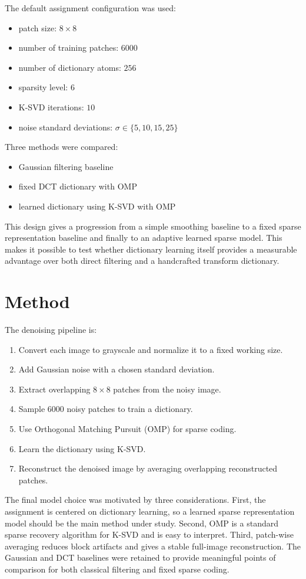 \documentclass[11pt]{article}
\begin{document}
The default assignment configuration was used:
\begin{itemize}
\item patch size: $8 \times 8$
\item number of training patches: $6000$
\item number of dictionary atoms: $256$
\item sparsity level: $6$
\item K-SVD iterations: $10$
\item noise standard deviations: $\sigma \in \{5, 10, 15, 25\}$
\end{itemize}

Three methods were compared:
\begin{itemize}
\item Gaussian filtering baseline
\item fixed DCT dictionary with OMP
\item learned dictionary using K-SVD with OMP
\end{itemize}

This design gives a progression from a simple smoothing baseline to a fixed sparse representation baseline and finally to an adaptive learned sparse model. This makes it possible to test whether dictionary learning itself provides a measurable advantage over both direct filtering and a handcrafted transform dictionary.

\section{Method}
The denoising pipeline is:
\begin{enumerate}
\item Convert each image to grayscale and normalize it to a fixed working size.
\item Add Gaussian noise with a chosen standard deviation.
\item Extract overlapping $8 \times 8$ patches from the noisy image.
\item Sample $6000$ noisy patches to train a dictionary.
\item Use Orthogonal Matching Pursuit (OMP) for sparse coding.
\item Learn the dictionary using K-SVD.
\item Reconstruct the denoised image by averaging overlapping reconstructed patches.
\end{enumerate}

The final model choice was motivated by three considerations. First, the assignment is centered on dictionary learning, so a learned sparse representation model should be the main method under study. Second, OMP is a standard sparse recovery algorithm for K-SVD and is easy to interpret. Third, patch-wise averaging reduces block artifacts and gives a stable full-image reconstruction. The Gaussian and DCT baselines were retained to provide meaningful points of comparison for both classical filtering and fixed sparse coding.
\end{document}
